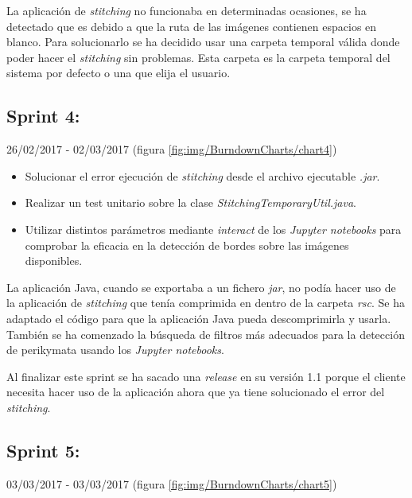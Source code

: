 La aplicación de \textit{stitching} no funcionaba en determinadas ocasiones, se ha detectado que es debido a que la ruta de las imágenes contienen espacios en blanco. Para solucionarlo se ha decidido usar una carpeta temporal válida donde poder hacer el \textit{stitching} sin problemas. Esta carpeta es la carpeta temporal del sistema por defecto o una que elija el usuario.

\newpage

\subsection{Sprint 4:} 
26/02/2017 - 02/03/2017 (figura \ref{fig:img/BurndownCharts/chart4})


\begin{itemize}
    \item Solucionar el error ejecución de \textit{stitching} desde el archivo ejecutable \textit{.jar}.
    \item Realizar un test unitario sobre la clase \textit{StitchingTemporaryUtil.java}.
    \item Utilizar distintos parámetros mediante \textit{interact} de los \textit{Jupyter notebooks} para comprobar la eficacia en la detección de bordes sobre las imágenes disponibles.
\end{itemize}

La aplicación Java, cuando se exportaba a un fichero \textit{jar}, no podía hacer uso de la aplicación de \textit{stitching} que tenía comprimida en dentro de la carpeta \textit{rsc}. Se ha adaptado el código para que la aplicación Java pueda descomprimirla y usarla. También se ha comenzado la búsqueda de filtros más adecuados para la detección de perikymata usando los \textit{Jupyter notebooks}.

Al finalizar este sprint se ha sacado una \textit{release} en su versión 1.1 porque el cliente necesita hacer uso de la aplicación ahora que ya tiene solucionado el error del \textit{stitching}.

\newpage

\subsection{Sprint 5:}
03/03/2017 - 03/03/2017 (figura \ref{fig:img/BurndownCharts/chart5})


